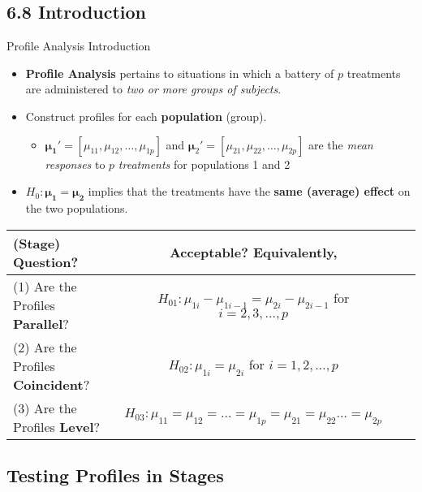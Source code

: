 \documentclass[8pt]{beamer}
\begin{document}
\subsection{6.8 Introduction}
    \begin{frame}{Profile Analysis Introduction} %
    \begin{itemize}
        \item \textbf{Profile Analysis} pertains to situations in which a battery of $p$ treatments are administered to \textit{two or more groups of subjects}. 
        \item Construct profiles for each \textbf{population} (group).  
        \begin{itemize}
            \item $\mathbf{\mu_{1}'} =  [\mu_{11},\mu_{12},\hdots,\mu_{1p}]$ and $\mathbf{\mu}_{2}' = [\mu_{21},\mu_{22},\hdots,\mu_{2p}]$ are the \textit{mean responses} to $p$ \textit{treatments} for populations 1 and 2
        \end{itemize}
        \item $H_{0}: \mathbf{\mu_{1} = \mu_{2}}$ implies that the treatments have the \textbf{same (average) effect} on the two populations.\\

        
    \end{itemize}
    \begin{center}
        \begin{tabular}{lclc}
        \hline 
        (Stage) Question?  & Acceptable? Equivalently, \\
        \hline 
           (1) Are the Profiles \textbf{Parallel}? &  $H_{01}:\mu_{1i} - \mu_{1i-1} = \mu_{2i} - \mu_{2i - 1}$ for $i = 2,3,\hdots,p$\\
            (2) Are the Profiles \textbf{Coincident}? & $H_{02}: \mu_{1i} = \mu_{2i}$ for $i = 1,2,\hdots,p$\\
            (3) Are the Profiles \textbf{Level}? & $H_{03}: \mu_{11} = \mu_{12} = \hdots = \mu_{1p} = \mu_{21} = \mu_{22} \hdots = \mu_{2p}$
        \end{tabular}
    \end{center}

    \end{frame}
    
\subsection{Testing Profiles in Stages}
    
\end{document}
